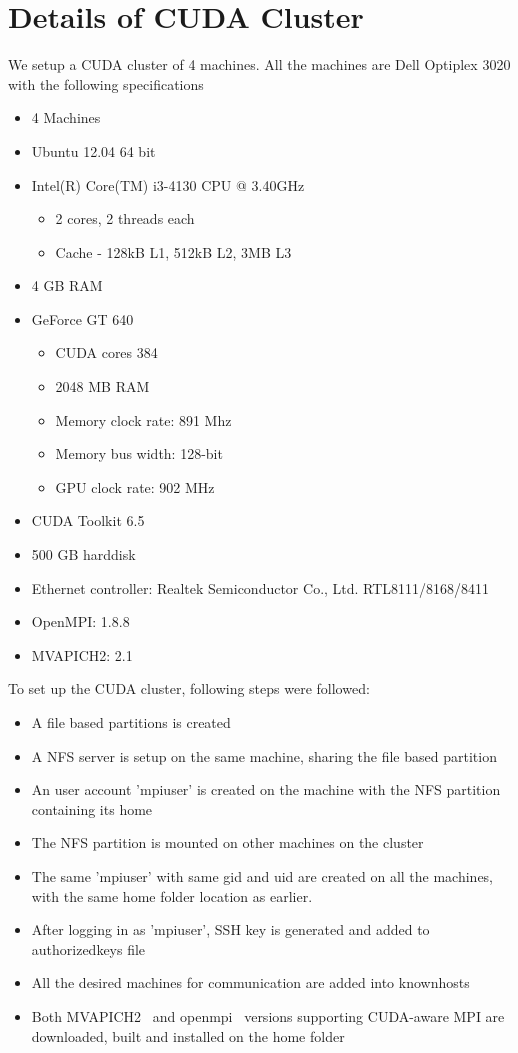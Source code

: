 \documentclass[10pt]{article}
\begin{document}
\section{Details of CUDA Cluster}
We setup a CUDA cluster of 4 machines. All the machines are Dell Optiplex 3020 with the following specifications
\begin{itemize}
\item 4 Machines
\item Ubuntu 12.04 64 bit
\item Intel(R) Core(TM) i3-4130 CPU @ 3.40GHz
\begin{itemize}
\item 2 cores, 2 threads each
\item Cache - 128kB L1, 512kB L2,  3MB L3 
\end{itemize}
\item 4 GB RAM
\item GeForce GT 640
\begin{itemize}
\item CUDA cores 384 
\item 2048 MB RAM
\item Memory clock rate: 891 Mhz
\item Memory bus width: 128-bit
\item GPU clock rate: 902 MHz 

\end{itemize}
\item CUDA Toolkit 6.5
\item 500 GB harddisk 
\item Ethernet controller: Realtek Semiconductor Co., Ltd. RTL8111/8168/8411
\item OpenMPI: 1.8.8
\item MVAPICH2: 2.1
\end{itemize}

To set up the CUDA cluster, following steps were followed:
\begin{itemize}
\item A file based partitions is created~\cite{filebased}
\item A NFS server is setup on the same machine, sharing the file based partition~\cite{nfssetup}
\item An user account 'mpiuser' is created on the machine with the NFS partition containing its home
\item The NFS partition is mounted on other machines on the cluster
\item The same 'mpiuser' with same gid and uid are created on all the machines, with the same home folder location as earlier.
\item After logging in as 'mpiuser', SSH key is generated and added to authorized\textunderscore keys file
\item All the desired machines for communication are added into known\textunderscore hosts 
\item Both MVAPICH2~\cite{mvapich} and openmpi~\cite{openmpi} versions supporting CUDA-aware MPI are downloaded, built and installed on the home folder 
\end{itemize}
\end{document}
